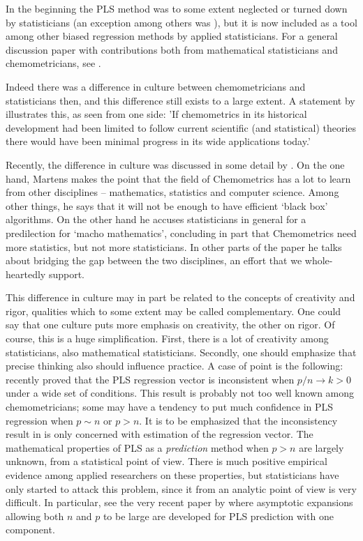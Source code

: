 \documentclass[num-refs]{wiley-article}
\begin{document}
In the beginning the PLS method was to some extent neglected or turned down by statisticians (an exception among others was \citep{frank1993statistical}), but it is now included as a tool among other biased regression methods by applied statisticians. For a general discussion paper with contributions both from mathematical statisticians and chemometricians, see \citet{sundberg1999multivariate}.

Indeed there was a difference in culture between chemometricians and statisticians then, and this difference still exists to a large extent. A statement by  \citet{munck2010physiochemical} illustrates this, as seen from one side: 'If chemometrics in its historical development had been limited to follow current scientific (and statistical) theories there would have been minimal progress in its wide applications today.'

Recently, the difference in culture was discussed in some detail by \citet{martens2015bigdata}. On the one hand, Martens makes the point that the field of Chemometrics has a lot to learn from other disciplines -- mathematics, statistics and computer science. Among other things, he says that it will not be enough to have efficient `black box' algorithms. On the other hand he accuses statisticians in general for a predilection for `macho mathematics', concluding in part that Chemometrics need more statistics, but not more statisticians. In other parts of the paper he talks about bridging the gap between the two disciplines, an effort that we whole-heartedly support.

This difference in culture may in part be related to the concepts of creativity and rigor, qualities which to some extent may be called complementary. One could say that one culture puts more emphasis on creativity, the other on rigor. Of course, this is a huge simplification. First, there is a lot of creativity among statisticians, also mathematical statisticians. Secondly, one should emphasize that precise thinking also should influence practice. A case of point is the following:   \citet{chung2010sparse} recently proved that the PLS regression vector is inconsistent when $p/n\rightarrow k>0$  under a wide set of conditions. This result is probably not too well known among chemometricians; some may have a tendency to put much confidence in PLS regression when $p\sim n$ or $p>n$. It is to be emphasized that the inconsistency result in \citep{chung2010sparse} is only concerned with estimation of the regression vector. The mathematical properties of PLS as a \emph{prediction} method when $p>n$ are largely unknown, from a statistical point of view. There is much positive empirical evidence among applied researchers on these properties, but statisticians have only started to attack this problem, since it from an analytic point of view is very difficult. In particular, see the very recent paper by \citet{cook2017pls} where asymptotic expansions allowing both $n$ and $p$ to be large are developed for PLS prediction with one component.
\end{document}
